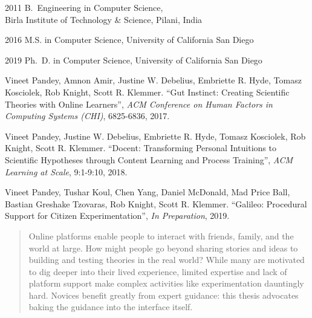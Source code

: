 \begin{frontmatter}
%
%
\begin{vitapage}
\begin{vita}
  \item[2011] B.~Engineering in Computer Science, \\Birla Institute of Technology \& Science, Pilani, India
  \item[2016] M.S. in Computer Science, University of California San Diego
  \item[2019] Ph.~D. in Computer Science, University of California San Diego
\end{vita}
\begin{publications}
 \item Vineet Pandey, Amnon Amir, Justine W. Debelius, Embriette R. Hyde, Tomasz Kosciolek, Rob Knight, Scott R. Klemmer. ``Gut Instinct: Creating Scientific Theories
with Online Learners'', \emph{ACM Conference on Human Factors in Computing Systems (CHI)}, 6825-6836, 2017.
\item Vineet Pandey, Justine W. Debelius, Embriette R. Hyde, Tomasz Kosciolek, Rob Knight, Scott R. Klemmer. ``Docent: Transforming Personal Intuitions to Scientific Hypotheses
through Content Learning and Process Training'', \emph{ACM Learning at Scale}, 9:1-9:10,  2018.
\item Vineet Pandey, Tushar Koul, Chen Yang, Daniel McDonald, Mad Price Ball, Bastian Greshake Tzovaras, Rob Knight, Scott R. Klemmer. ``Galileo: Procedural Support for Citizen Experimentation'', \emph{In Preparation},  2019.

\end{publications}
\end{vitapage}


%
%
\begin{abstract}
Online platforms enable people to interact with friends, family, and the world at large. How might people go beyond sharing stories and ideas to building and testing theories in the real world? While many are motivated to dig deeper into their lived experience, limited expertise and lack of platform support make complex activities like experimentation dauntingly hard. Novices benefit greatly from expert guidance: this thesis advocates baking the guidance into the interface itself.


\end{abstract}
\end{frontmatter}
